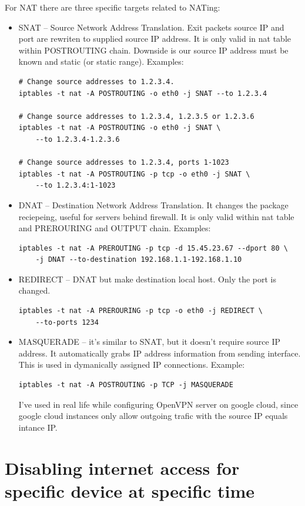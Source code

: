 \documentclass[times, utf8, seminar, english]{fer}
\begin{document}
For NAT there are three specific targets related to NATing:
\begin{itemize}
    \item SNAT -- Source Network Address Translation. Exit packets source IP and port are rewriten to supplied source IP address. It is only valid in nat table within POSTROUTING chain. Downside is our source IP address must be known and static (or static range). Examples:
    \begin{verbatim}
# Change source addresses to 1.2.3.4.
iptables -t nat -A POSTROUTING -o eth0 -j SNAT --to 1.2.3.4

# Change source addresses to 1.2.3.4, 1.2.3.5 or 1.2.3.6
iptables -t nat -A POSTROUTING -o eth0 -j SNAT \
    --to 1.2.3.4-1.2.3.6

# Change source addresses to 1.2.3.4, ports 1-1023
iptables -t nat -A POSTROUTING -p tcp -o eth0 -j SNAT \
    --to 1.2.3.4:1-1023
    \end{verbatim}
    \item DNAT -- Destination Network Address Translation. It changes the package reciepeing, useful for servers behind firewall. It is only valid within nat table and PREROURING and OUTPUT chain. Examples:
    \begin{verbatim}
iptables -t nat -A PREROUTING -p tcp -d 15.45.23.67 --dport 80 \
    -j DNAT --to-destination 192.168.1.1-192.168.1.10
    \end{verbatim}
    \item REDIRECT -- DNAT but make destination local host. Only the port is changed.
    \begin{verbatim}
iptables -t nat -A PREROURING -p tcp -o eth0 -j REDIRECT \
    --to-ports 1234
    \end{verbatim}
    \item MASQUERADE -- it's similar to SNAT, but it doesn't require source IP address. It automatically grabs IP address information from sending interface. This is used in dymanically assigned IP connections. Example:
    \begin{verbatim}
iptables -t nat -A POSTROUTING -p TCP -j MASQUERADE
    \end{verbatim}
    I've used in real life while configuring OpenVPN server on google cloud, since google cloud instances only allow outgoing trafic with the source IP equals intance IP.
\end{itemize}

\section{Disabling internet access for specific device at specific time}
\end{document}
